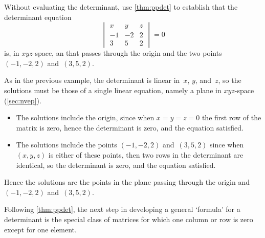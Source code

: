 \begin{example} \label{eg:planeq}
Without evaluating the determinant, use \cref{thm:ppdet} to establish that the determinant equation
\begin{equation*}
\begin{vmatrix} x&y&z\\-1&-2&2\\3&5&2 \end{vmatrix}=0
\end{equation*}
is, in \(xyz\)-space, an  that passes through the origin and the two points \((-1,-2,2)\) and~\((3,5,2)\).
\begin{solution} 
As in the previous example, the determinant is linear in~\(x\), \(y\), and~\(z\), so the solutions must be those of a single linear equation, namely a plane in \(xyz\)-space (\cref{sec:nvep}).
\begin{itemize}
\item The solutions include the origin, since when \(x=y=z=0\) the first row of the matrix is zero, hence the determinant is zero, and the equation satisfied.
\item The solutions include the  points \((-1,-2,2)\) and~\((3,5,2)\) since when \((x,y,z)\) is either of these points, then two rows in the determinant are identical, so the determinant is zero, and the equation satisfied.
\end{itemize}
Hence the solutions are the points in the plane passing through the origin and \((-1,-2,2)\) and~\((3,5,2)\).
\end{solution}
\end{example}






Following \cref{thm:ppdet}, the next step in developing a general `formula' for a determinant is the special class of matrices for which one column or row is zero except for one element.



